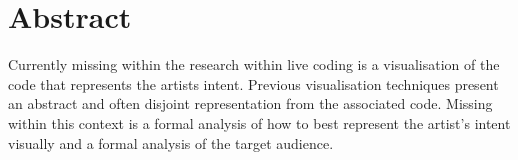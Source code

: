 
\chapter*{Abstract}
\label{cha:abstract}

Currently missing within the research within live coding is a visualisation of the code that represents the artists intent. Previous visualisation techniques present an abstract and often disjoint representation from the associated code. Missing within this context is a formal analysis of how to best represent the artist's intent visually and a formal analysis of the target audience.

